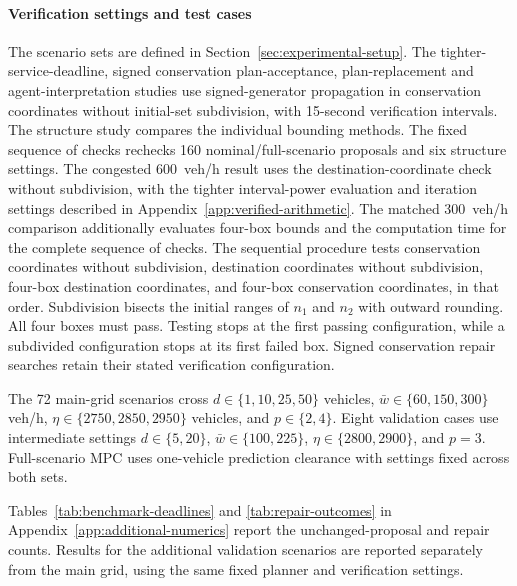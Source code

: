 \documentclass[final]{cas-sc}
\theoremstyle{definition}
\theoremstyle{plain}
\theoremstyle{definition}
\theoremstyle{plain}
\newcommand{\appref}[1]{Appendix~\ref{#1}}
\begin{document}
\paragraph{Verification settings and test cases}
The scenario sets are defined in Section~\ref{sec:experimental-setup}.
The tighter-service-deadline, signed conservation plan-acceptance,
plan-replacement and agent-interpretation studies
use signed-generator propagation in conservation coordinates without initial-set
subdivision, with 15-second verification intervals. The structure study
compares the individual bounding methods. The fixed sequence of checks rechecks
160 nominal/full-scenario proposals and six structure settings. The
congested 600~veh/h result uses the destination-coordinate check
without subdivision, with the tighter interval-power evaluation and
iteration settings described in \appref{app:verified-arithmetic}. The matched 300~veh/h comparison additionally
evaluates four-box bounds and the computation time for the complete sequence of checks. The sequential procedure tests conservation coordinates without
subdivision, destination coordinates without subdivision, four-box
destination coordinates, and four-box conservation coordinates, in that
order. Subdivision bisects the initial ranges of $n_1$ and $n_2$ with
outward rounding. All four boxes must pass. Testing stops at the first
passing configuration, while a subdivided configuration stops at its
first failed box. Signed conservation repair searches retain their stated
verification configuration.

The 72 main-grid scenarios cross $d\in\{1,10,25,50\}$ vehicles,
$\bar w\in\{60,150,300\}$ veh/h, $\eta\in\{2750,2850,2950\}$ vehicles,
and $p\in\{2,4\}$. Eight validation cases use intermediate settings
$d\in\{5,20\}$, $\bar w\in\{100,225\}$,
$\eta\in\{2800,2900\}$, and $p=3$. Full-scenario MPC uses one-vehicle
prediction clearance with settings fixed across both sets.

Tables~\ref{tab:benchmark-deadlines} and \ref{tab:repair-outcomes}
in \appref{app:additional-numerics} report the unchanged-proposal and
repair counts. Results for the additional validation scenarios are
reported separately from the main grid, using the same fixed planner
and verification settings.
\end{document}
